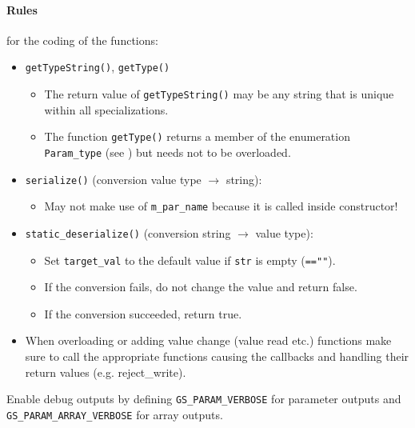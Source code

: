 \paragraph{Rules} for the coding of the functions:
\begin{itemize}
  \item \lstinline|getTypeString()|, \lstinline|getType()|
    \begin{itemize}
      \item The return value of \lstinline|getTypeString()| may be any string that is unique within all specializations.
      \item The function \lstinline|getType()| returns a member of the enumeration \lstinline|Param_type| (see ) but needs not to be overloaded.
    \end{itemize}
  \item \lstinline|serialize()| (conversion value type $\rightarrow$ string):
    \begin{itemize}
      \item May not make use of \lstinline|m_par_name| because it is called inside constructor!
    \end{itemize}
  \item \lstinline|static_deserialize()| (conversion string $\rightarrow$ value type):
    \begin{itemize}
      \item Set \lstinline|target_val| to the default value if \lstinline|str| is empty (\lstinline|==""|).
      \item If the conversion fails, do not change the value and return {\sffamily false}.
      \item If the conversion succeeded, return {\sffamily true}.
    \end{itemize}
  \item When overloading or adding value change (value read etc.) functions make sure to call the appropriate functions causing the callbacks and handling their return values (e.g. reject\_write). %
\end{itemize}

Enable debug outputs by defining \lstinline|GS_PARAM_VERBOSE| for parameter outputs and \lstinline|GS_PARAM_ARRAY_VERBOSE| for array outputs.


